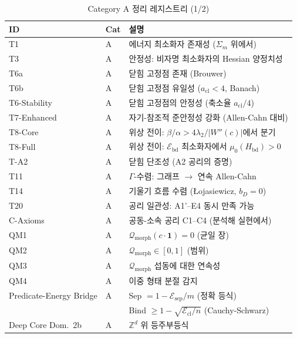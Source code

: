 \begin{table}[p]
\centering
\caption{Category A 정리 레지스트리 (1/2)}
\label{tab:theorem-registry-1}
\small
\begin{tabular}{llp{7.5cm}}
\hline
\textbf{ID} & \textbf{Cat} & \textbf{설명} \\
\hline
T1 & A & 에너지 최소화자 존재성 ($\Sigma_m$ 위에서) \\
T3 & A & 안정성: 비자명 최소화자의 Hessian 양정치성 \\
T6a & A & 닫힘 고정점 존재 (Brouwer) \\
T6b & A & 닫힘 고정점 유일성 ($a_{\mathrm{cl}} < 4$, Banach) \\
T6-Stability & A & 닫힘 고정점의 안정성 (축소율 $a_{\mathrm{cl}}/4$) \\
T7-Enhanced & A & 자기-참조적 준안정성 강화 (Allen-Cahn 대비) \\
T8-Core & A & 위상 전이: $\beta/\alpha > 4\lambda_2/|W''(c)|$에서 분기 \\
T8-Full & A & 위상 전이: $\mathcal{E}_{\mathrm{bd}}$ 최소화자에서 $\mu_0(H_{\mathrm{bd}}) > 0$ \\
T-A2 & A & 닫힘 단조성 (A2 공리의 증명) \\
T11 & A & $\Gamma$-수렴: 그래프 $\to$ 연속 Allen-Cahn \\
T14 & A & 기울기 흐름 수렴 (Łojasiewicz, $b_D = 0$) \\
T20 & A & 공리 일관성: A1'--E4 동시 만족 가능 \\
\hline
C-Axioms & A & 공동-소속 공리 C1--C4 (분석해 실현에서) \\
QM1 & A & $\mathcal{Q}_{\mathrm{morph}}(c \cdot \mathbf{1}) = 0$ (균일 장) \\
QM2 & A & $\mathcal{Q}_{\mathrm{morph}} \in [0, 1]$ (범위) \\
QM3 & A & $\mathcal{Q}_{\mathrm{morph}}$ 섭동에 대한 연속성 \\
QM4 & A & 이중 형태 분절 감지 \\
\hline
Predicate-Energy Bridge & A & Sep $= 1 - \mathcal{E}_{\mathrm{sep}}/m$ (정확 등식) \\
 & & Bind $\geq 1 - \sqrt{\mathcal{E}_{\mathrm{cl}}/n}$ (Cauchy-Schwarz) \\
Deep Core Dom.\ 2b & A & $\mathbb{Z}^d$ 위 등주부등식 \\
\hline
\end{tabular}
\end{table}

